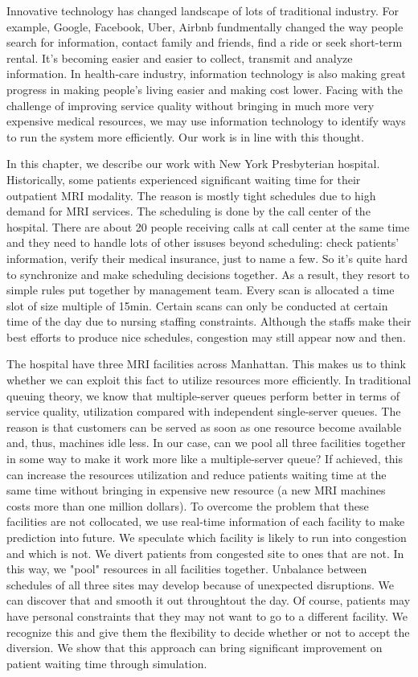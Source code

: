 Innovative technology has changed landscape of lots of traditional industry. For example, Google, Facebook, Uber, Airbnb fundmentally changed the way people search for information, contact family and friends, find a ride or seek short-term rental. It's becoming easier and easier to collect, transmit and analyze information. In health-care industry, information technology is also making great progress in making people's living easier and making cost lower. Facing with the challenge of improving service quality without bringing in much more very expensive medical resources, we may use information technology to identify ways to run the system more efficiently. Our work is in line with this thought.

In this chapter, we describe our work with New York Presbyterian hospital. Historically, some patients experienced significant waiting time for their outpatient MRI modality. The reason is mostly tight schedules due to high demand for MRI services. The scheduling is done by the call center of the hospital. There are about 20 people receiving calls at call center at the same time and they need to handle lots of other issuses beyond scheduling: check patients' information, verify their medical insurance, just to name a few. So it's quite hard to synchronize and make scheduling decisions together. As a result, they resort to simple rules put together by management team. Every scan is allocated a time slot of size multiple of 15min. Certain scans can only be conducted at certain time of the day due to nursing staffing constraints. Although the staffs make their best efforts to produce nice schedules, congestion may still appear now and then.

The hospital have three MRI facilities across Manhattan. This makes us to think whether we can exploit this fact to utilize resources more efficiently. In traditional queuing theory, we know that multiple-server queues perform better in terms of service quality, utilization compared with independent single-server queues. The reason is that customers can be served as soon as one resource become available and, thus, machines idle less. In our case, can we pool all three facilities together in some way to make it work more like a multiple-server queue? If achieved, this can increase the resources utilization and reduce patients waiting time at the same time without bringing in expensive new resource (a new MRI machines costs more than one million dollars). To overcome the problem that these facilities are not collocated, we use real-time information of each facility to make prediction into future. We speculate which facility is likely to run into congestion and which is not. We divert patients from congested site to ones that are not. In this way, we "pool" resources in all facilities together. Unbalance between schedules of all three sites may develop because of unexpected disruptions. We can discover that and smooth it out throughtout the day. Of course, patients may have personal constraints that they may not want to go to a different facility. We recognize this and give them the flexibility to decide whether or not to accept the diversion. We show that this approach can bring significant improvement on patient waiting time through simulation.

